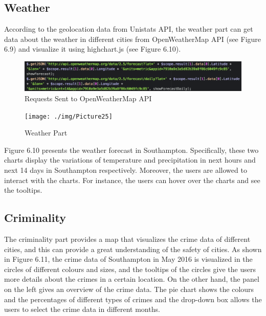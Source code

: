 \subsection{Weather}




According to the geolocation data from Unistats API, the weather part can get data about the weather in different cities from OpenWeatherMap API (see Figure 6.9) and visualize it using highchart.js (see Figure 6.10).

\begin{figure}[H]
  \centering
  \includegraphics[width=15cm]{./img/Picture24}
  \caption{Requests Sent to OpenWeatherMap API
}
  \label{Figure:figex}
\end{figure}

\begin{figure}[H]
  \centering
  \texttt{[image: ./img/Picture25]}
  \caption{Weather Part
}
  \label{Figure:figex}
\end{figure}

Figure 6.10 presents the weather forecast in Southampton. Specifically, these two charts display the variations of temperature and precipitation in next hours and next 14 days in Southampton respectively. Moreover, the users are allowed to interact with the charts. For instance, the users can hover over the charts and see the tooltips. 




\subsection{Criminality}

The criminality part provides a map that visualizes the crime data of different cities, and this can provide a great understanding of the safety of cities. As shown in Figure 6.11, the crime data of Southampton in May 2016 is visualized in the circles of different colours and sizes, and the tooltips of the circles give the users more details about the crimes in a certain location. On the other hand, the panel on the left gives an overview of the crime data. The pie chart shows the colours and the percentages of different types of crimes and the drop-down box allows the users to select the crime data in different months.

